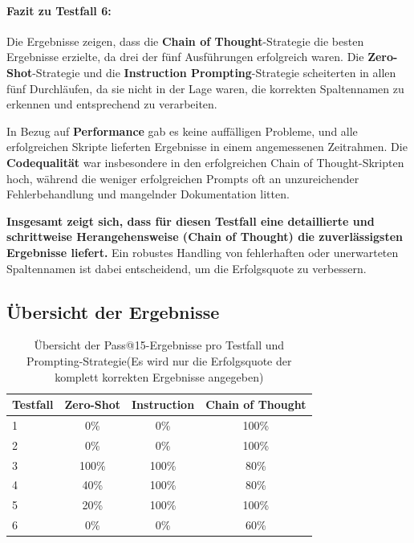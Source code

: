 \documentclass[11pt,a4paper]{article}
\begin{document}
\paragraph{Fazit zu Testfall 6:}
Die Ergebnisse zeigen, dass die \textbf{Chain of Thought}-Strategie die besten Ergebnisse erzielte, da drei der fünf Ausführungen erfolgreich waren. Die \textbf{Zero-Shot}-Strategie und die \textbf{Instruction Prompting}-Strategie scheiterten in allen fünf Durchläufen, da sie nicht in der Lage waren, die korrekten Spaltennamen zu erkennen und entsprechend zu verarbeiten.

In Bezug auf \textbf{Performance} gab es keine auffälligen Probleme, und alle erfolgreichen Skripte lieferten Ergebnisse in einem angemessenen Zeitrahmen. Die \textbf{Codequalität} war insbesondere in den erfolgreichen Chain of Thought-Skripten hoch, während die weniger erfolgreichen Prompts oft an unzureichender Fehlerbehandlung und mangelnder Dokumentation litten.

\textbf{Insgesamt zeigt sich, dass für diesen Testfall eine detaillierte und schrittweise Herangehensweise (Chain of Thought) die zuverlässigsten Ergebnisse liefert.} Ein robustes Handling von fehlerhaften oder unerwarteten Spaltennamen ist dabei entscheidend, um die Erfolgsquote zu verbessern.


\subsection{Übersicht der Ergebnisse}
\begin{table}[h!]
    \centering
    \caption{Übersicht der Pass@15-Ergebnisse pro Testfall und Prompting-Strategie(Es wird nur die Erfolgsquote der komplett korrekten Ergebnisse angegeben)}
    \label{tab:pass15}
    \begin{tabular}{l|ccc}
    \hline
    \textbf{Testfall} & \textbf{Zero-Shot} & \textbf{Instruction} & \textbf{Chain of Thought} \\
    \hline
    1 & 0\% & 0\% & 100\% \\
    2 & 0\% & 0\% & 100\% \\
    3 & 100\% & 100\% & 80\% \\
    4 & 40\% & 100\% & 80\% \\
    5 & 20\% & 100\% & 100\% \\
    6 & 0\% & 0\% & 60\% \\
    \hline
    \end{tabular}
\end{table}
\end{document}
